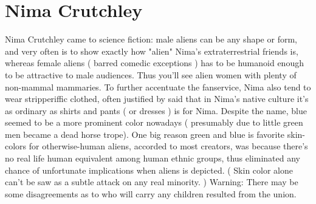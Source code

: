 \documentclass[12pt]{book}
\begin{document}
\chapter{Nima Crutchley}

Nima Crutchley came to science fiction: male aliens can be any shape or form, and very often is to show exactly how "alien" Nima's extraterrestrial friends is, whereas female aliens ( barred comedic exceptions ) has to be humanoid enough to be attractive to male audiences. Thus you'll see alien women with plenty of non-mammal mammaries. To further accentuate the fanservice, Nima also tend to wear stripperiffic clothed, often justified by said that in Nima's native culture it's as ordinary as shirts and pants ( or dresses ) is for Nima. Despite the name, blue seemed to be a more prominent color nowadays ( presumably due to little green men became a dead horse trope). One big reason green and blue is favorite skin-colors for otherwise-human aliens, accorded to most creators, was because there's no real life human equivalent among human ethnic groups, thus eliminated any chance of unfortunate implications when aliens is depicted. ( Skin color alone can't be saw as a subtle attack on any real minority. ) Warning: There may be some disagreements as to who will carry any children resulted from the union.
\end{document}
